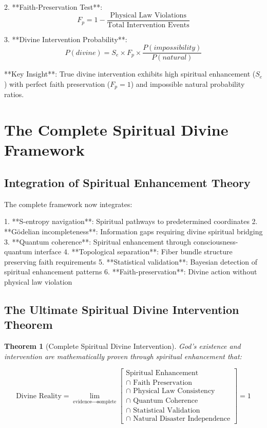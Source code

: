 \documentclass[12pt,a4paper]{article}
\newtheorem{theorem}{Theorem}[section]
\begin{document}
2. **Faith-Preservation Test**:
   $$F_p = 1 - \frac{\text{Physical Law Violations}}{\text{Total Intervention Events}}$$

3. **Divine Intervention Probability**:
   $$P(divine) = S_e \times F_p \times \frac{P(impossibility)}{P(natural)}$$

**Key Insight**: True divine intervention exhibits high spiritual enhancement ($S_e$) with perfect faith preservation ($F_p = 1$) and impossible natural probability ratios.

\section{The Complete Spiritual Divine Framework}

\subsection{Integration of Spiritual Enhancement Theory}

The complete framework now integrates:

1. **S-entropy navigation**: Spiritual pathways to predetermined coordinates
2. **Gödelian incompleteness**: Information gaps requiring divine spiritual bridging  
3. **Quantum coherence**: Spiritual enhancement through consciousness-quantum interface
4. **Topological separation**: Fiber bundle structure preserving faith requirements
5. **Statistical validation**: Bayesian detection of spiritual enhancement patterns
6. **Faith-preservation**: Divine action without physical law violation

\subsection{The Ultimate Spiritual Divine Intervention Theorem}

\begin{theorem}[Complete Spiritual Divine Intervention]
God's existence and intervention are mathematically proven through spiritual enhancement that:

$$\text{Divine Reality} = \lim_{\text{evidence} \to \text{complete}} \left[
\begin{array}{c}
\text{Spiritual Enhancement} \\
\cap \text{ Faith Preservation} \\
\cap \text{ Physical Law Consistency} \\
\cap \text{ Quantum Coherence} \\
\cap \text{ Statistical Validation} \\
\cap \text{ Natural Disaster Independence}
\end{array}
\right] = 1$$
\end{theorem}
\end{document}
